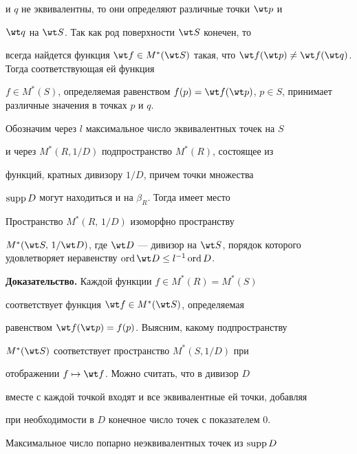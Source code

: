 и $q$ не эквивалентны, то они определяют различные точки $\wt p$ и


$\wt q$ на $\wt S$. Так как род поверхности $\wt S$ конечен, то


всегда найдется функция $\wt f\in M^*(\wt S)$ такая, что $\wt


f(\wt p)\ne \wt f(\wt q)$. Тогда соответствующая ей функция


$f\in M^*(S)$, определяемая равенством $f(p)=\wt f(\wt p)$, $p\in


S$, принимает различные значения в точках $p$ и $q$.


\medskip





Обозначим через $l$ максимальное число эквивалентных точек на $S$


и через $M^*(R, 1/D)$ подпространство $M^*(R)$, состоящее из


функций, кратных дивизору $1/D$, причем точки множества


$\operatorname{supp} D$ могут находиться и на $\beta_R$. Тогда имеет место





\begin{lem} Пространство $M^*(R,\,1/D)$ изоморфно пространству


$M^*(\wt S,\,1/\wt D)$, где $\wt D$ --- дивизор на $\wt


S$, порядок которого удовлетворяет неравенству $\ord \wt D\le


l^{-1}\ord D$.


\end{lem}





{\bf Доказательство.} Каждой функции $f\in M^*(R)=M^*(S)$


соответствует функция $\wt f\in M^*(\wt S)$, определяемая


равенством $\wt f(\wt p)=f(p)$. Выясним, какому подпространству


$M^*(\wt S)$ соответствует пространство $M^*(S,1/D)$ при


отображении $f\mapsto \wt f$. Можно считать, что в дивизор $D$


вместе с каждой точкой входят и все эквивалентные ей точки, добавляя


при необходимости в $D$ конечное число точек с показателем 0.


Максимальное число попарно неэквивалентных точек из $\operatorname{supp} D$


